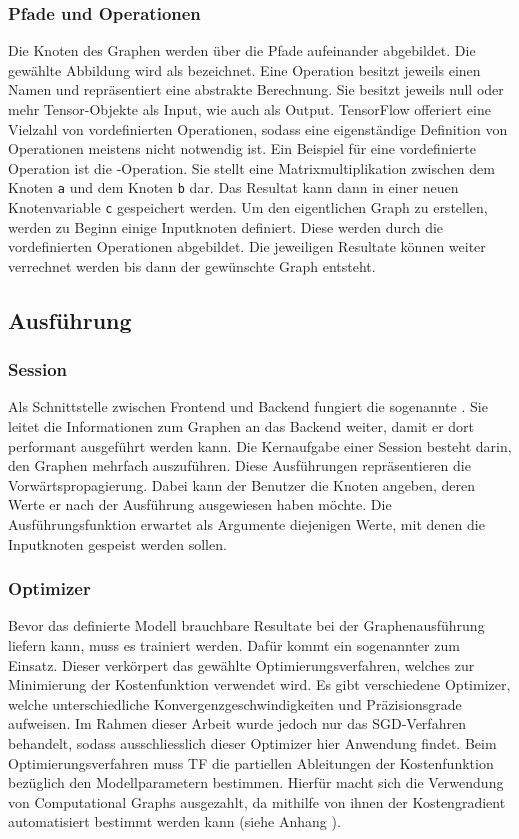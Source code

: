 \subsubsection{Pfade und Operationen}
Die Knoten des Graphen werden über die Pfade aufeinander
abgebildet. Die gewählte Abbildung wird als  bezeichnet.
Eine Operation besitzt jeweils einen Namen und repräsentiert eine
abstrakte Berechnung. Sie besitzt jeweils null oder mehr Tensor-Objekte als
Input, wie auch als Output.
\para{}
TensorFlow offeriert eine Vielzahl von vordefinierten Operationen, sodass eine eigenständige
Definition von Operationen meistens nicht notwendig ist.
Ein Beispiel für eine vordefinierte Operation ist die
-Operation. Sie stellt eine Matrixmultiplikation zwischen
dem Knoten \texttt{a} und dem Knoten \texttt{b} dar.
Das Resultat kann dann in einer neuen Knotenvariable \texttt{c} gespeichert werden.
\para{}
Um den eigentlichen Graph zu erstellen, werden zu Beginn einige Inputknoten
definiert. Diese werden durch die vordefinierten Operationen abgebildet.
Die jeweiligen Resultate können weiter verrechnet werden bis dann der gewünschte Graph
entsteht.

\subsection{Ausführung}
\subsubsection{Session}
Als Schnittstelle zwischen Frontend und Backend fungiert die sogenannte
. Sie leitet die Informationen zum Graphen an das Backend weiter, damit er
dort performant ausgeführt werden kann.
Die Kernaufgabe einer Session besteht darin, den Graphen mehrfach auszuführen.
Diese Ausführungen repräsentieren die Vorwärtspropagierung.
Dabei kann der Benutzer die Knoten angeben, deren Werte er nach der
Ausführung ausgewiesen haben möchte. Die Ausführungsfunktion erwartet als Argumente
diejenigen Werte, mit denen die Inputknoten gespeist werden sollen.


\subsubsection{Optimizer}
Bevor das definierte Modell brauchbare Resultate bei der Graphenausführung
liefern kann,
muss es trainiert werden. Dafür kommt ein sogenannter  zum Einsatz.
Dieser verkörpert das gewählte Optimierungsverfahren, welches zur Minimierung
der Kostenfunktion verwendet wird.
Es gibt verschiedene Optimizer, welche unterschiedliche
Konvergenzgeschwindigkeiten und Präzisionsgrade aufweisen.
Im Rahmen dieser Arbeit wurde jedoch nur das SGD-Verfahren behandelt, sodass
ausschliesslich dieser Optimizer hier Anwendung findet.
\para{}
Beim Optimierungsverfahren muss TF die partiellen Ableitungen der Kostenfunktion
bezüglich den Modellparametern bestimmen. Hierfür macht sich die Verwendung von
Computational Graphs ausgezahlt, da mithilfe von ihnen der Kostengradient
automatisiert bestimmt werden kann (siehe Anhang ).


